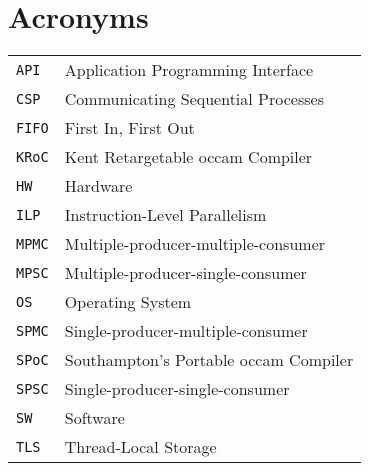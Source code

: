 
\chapter{Acronyms}
\label{ch:acronyms}

\begin{table}[h!]
    \centering
    \begin{tabular}{ll}
        \texttt{API}  & Application Programming Interface \\
        \texttt{CSP}  & Communicating Sequential Processes \\
        \texttt{FIFO} & First In, First Out \\
        \texttt{KRoC} & Kent Retargetable occam Compiler \\
        \texttt{HW}   & Hardware \\
        \texttt{ILP}  & Instruction-Level Parallelism \\
        \texttt{MPMC} & Multiple\hyp{}producer\hyp{}multiple\hyp{}consumer \\
        \texttt{MPSC} & Multiple\hyp{}producer\hyp{}single\hyp{}consumer \\
        \texttt{OS}   & Operating System \\
        \texttt{SPMC} & Single\hyp{}producer\hyp{}multiple\hyp{}consumer \\
        \texttt{SPoC} & Southampton's Portable occam Compiler \\
        \texttt{SPSC} & Single\hyp{}producer\hyp{}single\hyp{}consumer \\
        \texttt{SW}   & Software \\
        \texttt{TLS}  & Thread-Local Storage
    \end{tabular}
\end{table}